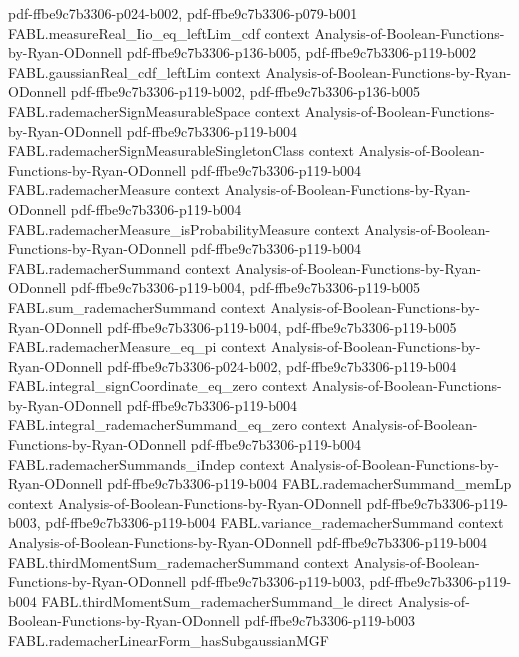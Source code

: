 \begin{theorem}
  {pdf-ffbe9c7b3306-p024-b002,
    pdf-ffbe9c7b3306-p079-b001}
\proofstep
  {FABL.measureReal_Iio_eq_leftLim_cdf}
  {context}
  {Analysis-of-Boolean-Functions-by-Ryan-ODonnell}
  {pdf-ffbe9c7b3306-p136-b005,
    pdf-ffbe9c7b3306-p119-b002}
\proofstep
  {FABL.gaussianReal_cdf_leftLim}
  {context}
  {Analysis-of-Boolean-Functions-by-Ryan-ODonnell}
  {pdf-ffbe9c7b3306-p119-b002,
    pdf-ffbe9c7b3306-p136-b005}
\proofstep
  {FABL.rademacherSignMeasurableSpace}
  {context}
  {Analysis-of-Boolean-Functions-by-Ryan-ODonnell}
  {pdf-ffbe9c7b3306-p119-b004}
\proofstep
  {FABL.rademacherSignMeasurableSingletonClass}
  {context}
  {Analysis-of-Boolean-Functions-by-Ryan-ODonnell}
  {pdf-ffbe9c7b3306-p119-b004}
\proofstep
  {FABL.rademacherMeasure}
  {context}
  {Analysis-of-Boolean-Functions-by-Ryan-ODonnell}
  {pdf-ffbe9c7b3306-p119-b004}
\proofstep
  {FABL.rademacherMeasure_isProbabilityMeasure}
  {context}
  {Analysis-of-Boolean-Functions-by-Ryan-ODonnell}
  {pdf-ffbe9c7b3306-p119-b004}
\proofstep
  {FABL.rademacherSummand}
  {context}
  {Analysis-of-Boolean-Functions-by-Ryan-ODonnell}
  {pdf-ffbe9c7b3306-p119-b004,
    pdf-ffbe9c7b3306-p119-b005}
\proofstep
  {FABL.sum_rademacherSummand}
  {context}
  {Analysis-of-Boolean-Functions-by-Ryan-ODonnell}
  {pdf-ffbe9c7b3306-p119-b004,
    pdf-ffbe9c7b3306-p119-b005}
\proofstep
  {FABL.rademacherMeasure_eq_pi}
  {context}
  {Analysis-of-Boolean-Functions-by-Ryan-ODonnell}
  {pdf-ffbe9c7b3306-p024-b002,
    pdf-ffbe9c7b3306-p119-b004}
\proofstep
  {FABL.integral_signCoordinate_eq_zero}
  {context}
  {Analysis-of-Boolean-Functions-by-Ryan-ODonnell}
  {pdf-ffbe9c7b3306-p119-b004}
\proofstep
  {FABL.integral_rademacherSummand_eq_zero}
  {context}
  {Analysis-of-Boolean-Functions-by-Ryan-ODonnell}
  {pdf-ffbe9c7b3306-p119-b004}
\proofstep
  {FABL.rademacherSummands_iIndep}
  {context}
  {Analysis-of-Boolean-Functions-by-Ryan-ODonnell}
  {pdf-ffbe9c7b3306-p119-b004}
\proofstep
  {FABL.rademacherSummand_memLp}
  {context}
  {Analysis-of-Boolean-Functions-by-Ryan-ODonnell}
  {pdf-ffbe9c7b3306-p119-b003,
    pdf-ffbe9c7b3306-p119-b004}
\proofstep
  {FABL.variance_rademacherSummand}
  {context}
  {Analysis-of-Boolean-Functions-by-Ryan-ODonnell}
  {pdf-ffbe9c7b3306-p119-b004}
\proofstep
  {FABL.thirdMomentSum_rademacherSummand}
  {context}
  {Analysis-of-Boolean-Functions-by-Ryan-ODonnell}
  {pdf-ffbe9c7b3306-p119-b003,
    pdf-ffbe9c7b3306-p119-b004}
\proofstep
  {FABL.thirdMomentSum_rademacherSummand_le}
  {direct}
  {Analysis-of-Boolean-Functions-by-Ryan-ODonnell}
  {pdf-ffbe9c7b3306-p119-b003}
\proofstep
  {FABL.rademacherLinearForm_hasSubgaussianMGF}

\end{theorem}
